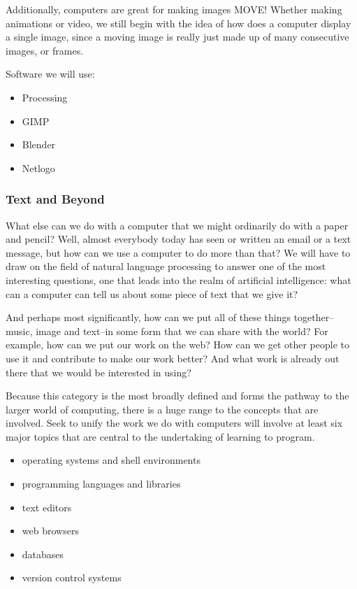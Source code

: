 \documentclass[11pt]{article}
\begin{document}
Additionally, computers are great for making images MOVE! Whether
making animations or video, we still begin with the idea of how does a
computer display a single image, since a moving image is really just
made up of many consecutive images, or frames.

Software we will use:

\begin{itemize}
\item Processing
\item GIMP
\item Blender
\item Netlogo
\end{itemize}

\subsubsection{Text and Beyond}
\label{sec:orgheadline7}
What else can we do with a computer that we might ordinarily do with a
paper and pencil? Well, almost everybody today has seen or written an
email or a text message, but how can we use a computer to do more than
that? We will have to draw on the field of natural language processing
to answer one of the most interesting questions, one that leads into
the realm of artificial intelligence: what can a computer can tell us
about some piece of text that we give it?

And perhaps most significantly, how can we put all of these things
together--music, image and text--in some form that we can share with
the world? For example, how can we put our work on the web? How can we
get other people to use it and contribute to make our work better? And
what work is already out there that we would be interested in using?

Because this category is the most broadly defined and forms the
pathway to the larger world of computing, there is a huge range to the
concepts that are involved. Seek to unify the work we do with
computers will involve at least six major topics that are central to
the undertaking of learning to program.

\begin{itemize}
\item operating systems and shell environments
\item programming languages and libraries
\item text editors
\item web browsers
\item databases
\item version control systems
\end{itemize}
\end{document}
